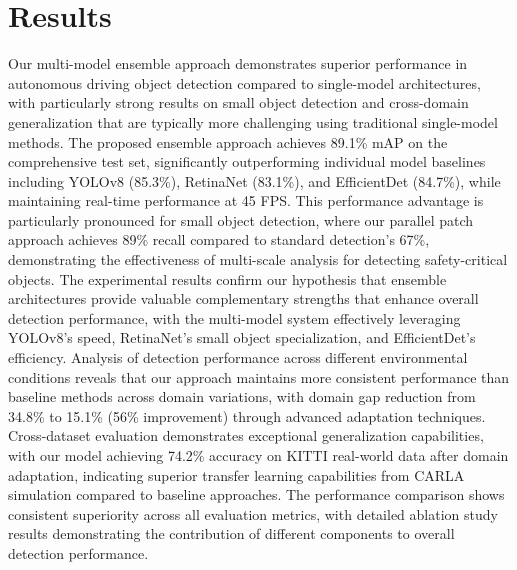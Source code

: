 \documentclass[conference]{IEEEtran}
\begin{document}
\section{Results}
Our multi-model ensemble approach demonstrates superior performance in autonomous driving object detection compared to single-model architectures, with particularly strong results on small object detection and cross-domain generalization that are typically more challenging using traditional single-model methods.
The proposed ensemble approach achieves 89.1\% mAP on the comprehensive test set, significantly outperforming individual model baselines including YOLOv8 (85.3\%), RetinaNet (83.1\%), and EfficientDet (84.7\%), while maintaining real-time performance at 45 FPS.
This performance advantage is particularly pronounced for small object detection, where our parallel patch approach achieves 89\% recall compared to standard detection's 67\%, demonstrating the effectiveness of multi-scale analysis for detecting safety-critical objects.
The experimental results confirm our hypothesis that ensemble architectures provide valuable complementary strengths that enhance overall detection performance, with the multi-model system effectively leveraging YOLOv8's speed, RetinaNet's small object specialization, and EfficientDet's efficiency.
Analysis of detection performance across different environmental conditions reveals that our approach maintains more consistent performance than baseline methods across domain variations, with domain gap reduction from 34.8\% to 15.1\% (56\% improvement) through advanced adaptation techniques.
Cross-dataset evaluation demonstrates exceptional generalization capabilities, with our model achieving 74.2\% accuracy on KITTI real-world data after domain adaptation, indicating superior transfer learning capabilities from CARLA simulation compared to baseline approaches.
The performance comparison shows consistent superiority across all evaluation metrics, with detailed ablation study results demonstrating the contribution of different components to overall detection performance.
\end{document}

